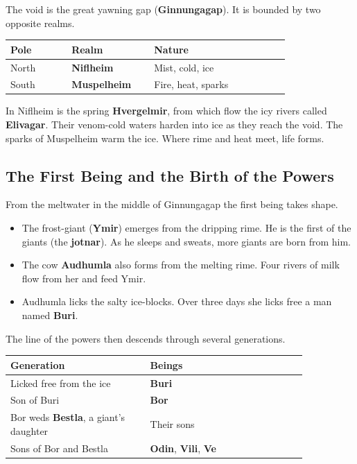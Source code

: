 The void is the great yawning gap (\textbf{Ginnungagap}). It is bounded by two opposite realms.

\begin{longtable}{L{0.18\linewidth}
L{0.22\linewidth} L{0.4\linewidth}}
\toprule
\textbf{Pole} & \textbf{Realm} & \textbf{Nature} \\
\midrule
North & \textbf{Niflheim} & Mist, cold, ice \\
South & \textbf{Muspelheim} & Fire, heat, sparks \\
\bottomrule
\end{longtable}

In Niflheim is the spring \textbf{Hvergelmir}, from which flow the icy rivers called \textbf{Elivagar}. Their venom-cold waters harden into ice as they reach the void. The sparks of Muspelheim warm the ice. Where rime and heat meet, life forms.

\subsection{The First Being and the Birth of the Powers}

From the meltwater in the middle of Ginnungagap the first being takes shape.

\begin{itemize}
 \item The frost-giant (\textbf{Ymir}) emerges from the dripping rime. He is the first of the giants (the \textbf{jotnar}). As he sleeps and sweats, more giants are born from him.
 \item The cow \textbf{Audhumla} also forms from the melting rime. Four rivers of milk flow from her and feed Ymir.
 \item Audhumla licks the salty ice-blocks. Over three days she licks free a man named \textbf{Buri}.
\end{itemize}

The line of the powers then descends through several generations.

\begin{longtable}{L{0.4\linewidth}
L{0.45\linewidth}}
\toprule
\textbf{Generation} & \textbf{Beings} \\
\midrule
Licked free from the ice & \textbf{Buri} \\
Son of Buri & \textbf{Bor} \\
Bor weds \textbf{Bestla}, a giant's daughter & Their sons \\
Sons of Bor and Bestla & \textbf{Odin}, \textbf{Vili}, \textbf{Ve} \\
\bottomrule
\end{longtable}

